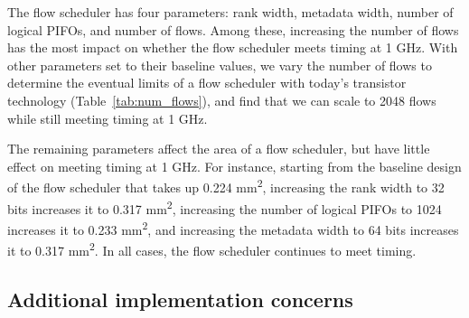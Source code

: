 The flow scheduler has four parameters: rank width, metadata width, number of
logical PIFOs, and number of flows. Among these, increasing the number of flows
has the most impact on whether the flow scheduler meets timing at 1 GHz.   With other parameters set to their baseline values, we vary the number
of flows to determine the eventual limits of a flow scheduler with today's
transistor technology (Table~\ref{tab:num_flows}), and find that we can scale
to 2048 flows while still meeting timing at 1 GHz.

The remaining parameters affect the area of a flow scheduler, but have
little effect on meeting timing at 1 GHz. For instance, starting from
the baseline design of the flow scheduler that takes up 0.224
\si{\milli\metre\squared}, increasing the rank width to 32 bits increases it
 to 0.317 \si{\milli\metre\squared}, increasing the number of logical
PIFOs to 1024 increases it to 0.233 \si{\milli\metre\squared}, and
increasing the metadata width to 64 bits increases it to 0.317
\si{\milli\metre\squared}. In all cases, the flow scheduler continues to meet timing.


\subsection{Additional implementation concerns}
\label{ss:add_impl}


